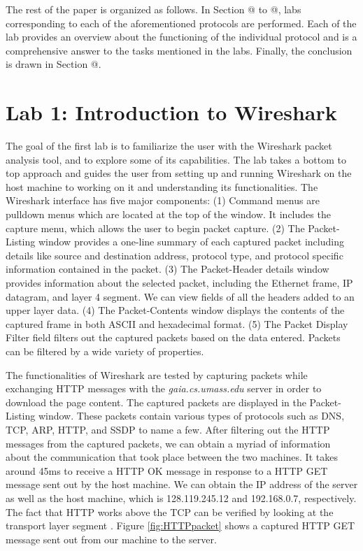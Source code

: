 \documentclass[10pt]{IEEEtran}
\makeatletter
\newcommand{\Rmnum}[1]{\expandafter\@slowromancap\romannumeral #1@}
\makeatother
\begin{document}
 The rest of the paper is organized as follows. In Section \Rmnum{2} to \Rmnum{7}, labs corresponding to each of the aforementioned protocols are performed. Each of the lab provides an overview about the functioning of the individual protocol and is a comprehensive answer to the tasks mentioned in the labs. Finally, the conclusion is drawn in Section \Rmnum{8}.\\ 

\section{Lab 1: Introduction to Wireshark}

 The goal of the first lab is to familiarize the user with the Wireshark packet analysis tool, and to explore some of its capabilities. The lab takes a bottom to top approach and guides the user from setting up and running Wireshark on the host machine to working on it and understanding its functionalities. The Wireshark interface has five major components: (1)  Command menus are pulldown menus which are located at the top of the window. It includes the capture menu, which allows the user to begin packet capture. (2) The Packet-Listing window provides a one-line summary of each captured packet including details like source and destination address, protocol type, and protocol specific information contained in the packet. (3) The Packet-Header details window provides information about the selected packet, including the Ethernet frame, IP datagram, and layer 4 segment. We can view fields of all the headers added to an upper layer data. (4) The Packet-Contents window displays the contents of the captured frame in both ASCII and hexadecimal format. (5) The Packet Display Filter field filters out the captured packets based on the data entered. Packets can be filtered by a wide variety of properties.
 
 The functionalities of Wireshark are tested by capturing packets while exchanging HTTP messages with the \textit{gaia.cs.umass.edu} server in order to download the page content. The captured packets are displayed in the Packet-Listing window. These packets contain various types of protocols such as DNS, TCP, ARP, HTTP, and SSDP to name a few. After filtering out the HTTP messages from the captured packets, we can obtain a myriad of information about the communication that took place between the two machines. It takes around 45ms to receive a HTTP OK message in response to a HTTP GET message sent out by the host machine. We can obtain the IP address of the server as well as the host machine, which is 128.119.245.12 and 192.168.0.7, respectively. The fact that HTTP works above the TCP can be verified by looking at the transport layer segment . Figure \ref{fig:HTTPpacket} shows a captured HTTP GET message sent out from our machine to the server.  \\
\end{document}
